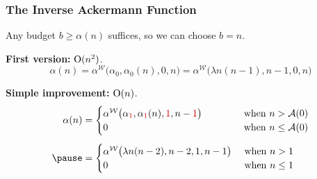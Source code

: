 \begin{frame}
\frametitle{The Inverse Ackermann Function}

Any budget $b \ge \alpha(n)$ suffices, so we can choose $b = n$.

\bigskip

\pause
\textbf{First version:} $\text{O}(n^2)$.
\pause
\begin{equation*}
\alpha(n) = \alpha^{\mathcal{W}}\big(\alpha_0, \alpha_0(n), 0, n\big)
= \alpha^{\mathcal{W}}\big(\lambda n(n - 1), n - 1, 0, n\big)
\end{equation*}

\smallskip

\pause
\textbf{Simple improvement:} $\text{O}(n)$.
\pause
\begin{equation*}
\begin{aligned}
\alpha(n) & = \begin{cases}
\alpha^{\mathcal{W}}\big(\alpha_{{\color{red} 1}}, \alpha_{{\color{red} 1}}(n), {{\color{red} 1}}, n - {{\color{red} 1}}\big) & \hspace{3em}\text{ when } n > \Ack(0) \\
0 & \hspace{3em}\text{ when } n \le \Ack(0)
\end{cases} \\[5pt]
\pause & = \begin{cases}
\alpha^{\mathcal{W}}\big(\lambda n(n - 2), n - 2, 1, n - 1\big) & \text{ when } n > 1 \\
0 & \text{ when } n \le 1
\end{cases}
\end{aligned}
\end{equation*}

\end{frame}
